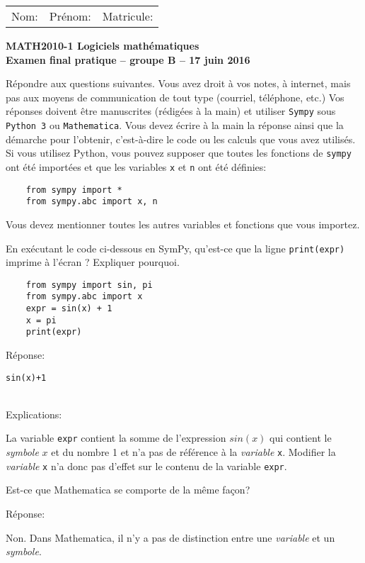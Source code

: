 




{\bfseries\sffamily
\begin{tabular}{p{5cm}p{6cm}r}
    Nom: & Prénom: & Matricule:
\end{tabular}}
\medskip

\begin{center}
  \normalfont\sffamily\large\bfseries\color{black}
    MATH2010-1 Logiciels mathématiques\\
    Examen final pratique -- groupe B -- 17 juin 2016
\end{center}

Répondre aux questions suivantes. 
Vous avez droit à vos notes, à internet, mais pas aux moyens de communication
de tout type (courriel, téléphone, etc.)
Vos réponses doivent être manuscrites
(rédigées à la main) et utiliser \texttt{Sympy} sous \texttt{Python 3} ou
\texttt{Mathematica}.
Vous devez écrire à la main la réponse ainsi que la démarche pour l'obtenir,
c'est-à-dire le code ou les calculs que vous avez utilisés.
Si vous utilisez Python, vous pouvez supposer que toutes les fonctions de
\verb|sympy| ont été importées et que les variables \verb|x| et \verb|n| ont
été définies:
\begin{verbatim}
    from sympy import *
    from sympy.abc import x, n
\end{verbatim}
Vous devez mentionner toutes les autres variables et fonctions que vous
importez.

\begin{question}[2 pts]
En exécutant le code ci-dessous en SymPy, qu'est-ce que la ligne
\texttt{print(expr)} imprime à l'écran ? Expliquer pourquoi.
\begin{verbatim}
    from sympy import sin, pi
    from sympy.abc import x
    expr = sin(x) + 1
    x = pi
    print(expr)
\end{verbatim}
\begin{mybox}
    Réponse:
    \begin{reponse}
	\verb|sin(x)+1|
    \end{reponse}\\[5pt]
    Explications:
    \begin{reponse}
	La variable \verb|expr| contient la somme de l'expression $sin(x)$ qui
	contient le \emph{symbole} $x$
	et du nombre 1 et n'a pas de référence à la \emph{variable} \verb|x|.
	Modifier la \emph{variable} \verb|x| n'a donc pas d'effet sur le
	contenu de la variable \verb|expr|.
    \end{reponse}
\end{mybox}
Est-ce que Mathematica se comporte de la même façon?
\begin{mybox}
    Réponse:\\[10pt]
    \begin{reponse}
	Non. Dans Mathematica, il n'y a pas de distinction entre
	une \emph{variable} et un \emph{symbole}.
    \end{reponse}
\end{mybox}
\end{question}

